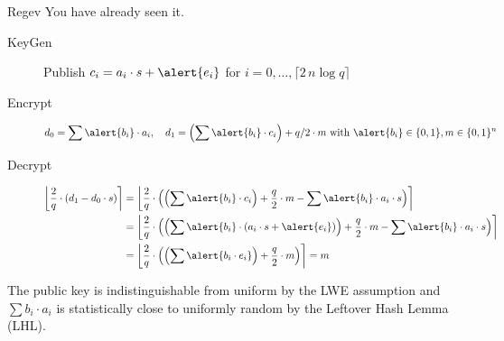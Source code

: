 \documentclass[xcolor=table,10pt,aspectratio=169]{beamer}
\begin{document}
\begin{frame}[label={sec:org3f1e679}]{Regev}
You have already seen it.

\begin{description}
\item[{KeyGen}] Publish \(c_{i} = a_{i} \cdot s + \alert{e_{i}}\) for \(i=0,\ldots, \lceil 2\, n \log q\rceil\)
\item[{Encrypt}] \[d_{0} = \sum \alert{b_{i}} \cdot a_{i},\quad  d_{1} = \left(\sum \alert{b_{i}} \cdot c_{i} \right) + q/2 \cdot m  \textnormal{ with } \alert{b_{i}} \in \bin, m \in \bin^{n}\]
\item[{Decrypt}] \begin{align*}
\left\lfloor \frac{2}{q} \cdot \left(d_{1} - d_{0} \cdot s\right) \right\rceil &= \left\lfloor \frac{2}{q} \cdot \left(\left(\sum \alert{b_{i}} \cdot c_{i} \right) + \frac{q}{2} \cdot m - \sum \alert{b_{i}} \cdot a_{i} \cdot s\right) \right\rceil\\
&= \left\lfloor \frac{2}{q} \cdot \left(\left(\sum \alert{b_{i}} \cdot (a_{i} \cdot s + \alert{e_{i}}) \right) + \frac{q}{2} \cdot m - \sum \alert{b_{i}} \cdot a_{i} \cdot s\right) \right\rceil\\
&= \left\lfloor \frac{2}{q} \cdot \left(\left(\sum \alert{b_{i} \cdot e_{i}} \right) + \frac{q}{2} \cdot m \right) \right\rceil = m
\end{align*}
\end{description}

The public key is indistinguishable from uniform by the LWE assumption and \(\sum b_{i} \cdot a_{i}\) is statistically close to uniformly random by the Leftover Hash Lemma (LHL).
\end{frame}
\end{document}
